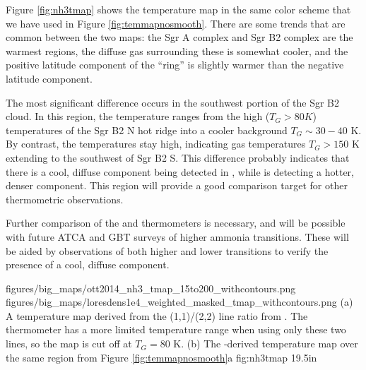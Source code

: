 
Figure \ref{fig:nh3tmap} shows the \citet{Ott2014a} temperature map in the same
color scheme that we have used in Figure \ref{fig:temmapnosmooth}.  There are some
trends that are common between the two maps: the Sgr A complex and Sgr B2
complex are the warmest regions, the diffuse gas surrounding these is
somewhat cooler, and the positive latitude component of the
\citet{Molinari2011a} ``ring'' is slightly warmer than the negative latitude
component.

The most significant difference occurs in the southwest portion of the Sgr B2
cloud.  In this region, the \ammonia temperature ranges from the high ($T_G>80K$)
temperatures of the Sgr B2 N hot ridge into a cooler background $T_G\sim30-40$ K.
By contrast, the \formaldehyde temperatures stay high, indicating gas
temperatures $T_G>150$ K extending to the southwest of Sgr B2 S.  This difference
probably indicates that there is a cool, diffuse component being detected in
\ammonia, while \formaldehyde is detecting a hotter, denser component.  This
region will provide a good comparison target for other thermometric
observations.  

Further comparison of the \ammonia and \formaldehyde thermometers is necessary,
and will be possible with future ATCA and GBT surveys of higher ammonia
transitions.  These will be aided by observations of both higher and lower
\formaldehyde transitions \citep{Mangum1993a} to verify the presence of a cool,
diffuse component.



\RotFigureTwoAA
{figures/big_maps/ott2014_nh3_tmap_15to200_withcontours.png}
{figures/big_maps/loresdens1e4_weighted_masked_tmap_withcontours.png}
{(a) A temperature map derived from the \ammonia (1,1)/(2,2) line ratio from
\citet{Ott2014a}.  The \ammonia thermometer has a more limited temperature
range when using only these two lines, so the map is cut off at $T_G=80$ K.
(b) The \para-derived temperature map over the same region from Figure
\ref{fig:temmapnosmooth}a
}
{fig:nh3tmap}
{1}{9.5in}

